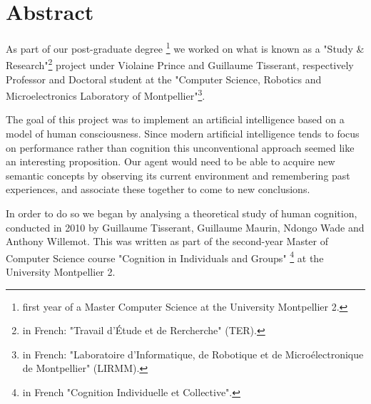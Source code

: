 \chapter*{Abstract}

As part of our post-graduate degree \footnote{first year of a Master Computer Science at the University Montpellier 2.} we worked on what is known as a "Study \& Research"\footnote{in French: "Travail d'Étude et de Rercherche" (TER).} project under \mbox{Violaine} \mbox{Prince} and \mbox{Guillaume} \mbox{Tisserant}, respectively Professor and Doctoral student at the "Computer Science, Robotics and Microelectronics Laboratory of Montpellier"\footnote{in French: "Laboratoire d'Informatique, de Robotique et de Microélectronique de Montpellier" (LIRMM).}. 

The goal of this project was to implement an artificial intelligence based on a model of human consciousness. Since modern artificial intelligence tends to focus on performance rather than cognition this unconventional approach seemed like an interesting proposition. 
Our agent would need to be able to acquire new semantic concepts by observing its current environment and remembering past experiences, and associate these together to come to new conclusions. 

In order to do so we began by analysing a theoretical study of human cognition, conducted in 2010 by \mbox{Guillaume} \mbox{Tisserant}, \mbox{Guillaume} \mbox{Maurin}, \mbox{Ndongo} \mbox{Wade} and \mbox{Anthony} \mbox{Willemot}. This was written as part of the second-year Master of Computer Science course "Cognition in Individuals and Groups" \footnote{in French "Cognition Individuelle et Collective".} at the University Montpellier 2.
